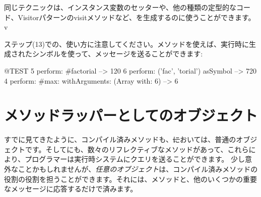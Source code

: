 \documentclass[a4paper,10pt,twoside]{book}
\begin{document}
同じテクニックは、インスタンス変数のセッターや、他の種類の定型的なコード、Visitorパターンのvisitメソッドなど、を生成するのに使うことができます。v

ステップ(13)での、使い方に注意してください。メソッドを使えば、実行時に生成されたシンボルを使って、メッセージを送ることができます:
\begin{code}{@TEST}
5 perform: #factorial                                             --> 120
6 perform: ('fac', 'torial') asSymbol                       --> 720
4 perform: #max: withArguments: (Array with: 6) --> 6
\end{code}

\section{メソッドラッパーとしてのオブジェクト}

すでに見てきたように、コンパイル済みメソッドも、\st においては、普通のオブジェクトです。そしてにも、数々のリフレクティブなメソッドがあって、これらにより、プログラマーは実行時システムにクエリを送ることができます。
少し意外なことかもしれませんが、\emph{任意のオブジェクト}は、コンパイル済みメソッドの役割の役割を担うことができます。それには、メソッドと、他のいくつかの重要なメッセージに応答するだけで済みます。%

\end{document}
